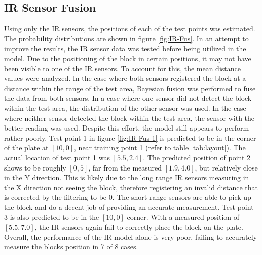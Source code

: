 \documentclass[12pt]{article}
\begin{document}
\subsection{IR Sensor Fusion}
Using only the IR sensors, the positions of each of the test points was estimated. The probability distributions are shown in figure \ref{fig:IR-Fus}. In an attempt to improve the results, the IR sensor data was tested before being utilized in the model. Due to the positioning of the block in certain positions, it may not have been visible to one of the IR sensors. To account for this, the mean distance values were analyzed. In the case where both sensors  registered the block at a distance within the range of the test area, Bayesian fusion was performed to fuse the data from both sensors. In a case where one sensor did not detect the block within the test area, the distribution of the other sensor was used. In the case where neither sensor detected the block within the test area, the sensor with the better reading was used. Despite this effort, the model still appears to perform rather poorly. Test point 1 in figure \ref{fig:IR-Fus-1} is predicted to be in the corner of the plate at $[10, 0]$, near training point 1 (refer to table \ref{tab:layout}). The actual location of test point 1 was $[5.5, 2.4]$. The predicted position of point 2 shows to be roughly $[0, 5]$, far from the measured $[1.9, 4.0]$, but relatively close in the Y direction. This is likely due to the long range IR sensors measuring in the X direction not seeing the block, therefore registering an invalid distance that is corrected by the filtering to be 0. The short range sensors are able to pick up the block and do a decent job of providing an accurate measurement. Test point 3 is also predicted to be in the $[10, 0]$ corner. With a measured position of $[5.5, 7.0]$, the IR sensors again fail to correctly place the block on the plate. Overall, the performance of the IR model alone is very poor, failing to accurately measure the blocks position in 7 of 8 cases.
\end{document}

